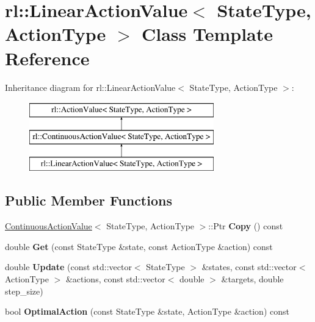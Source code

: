 \hypertarget{classrl_1_1_linear_action_value}{}\section{rl\+:\+:Linear\+Action\+Value$<$ State\+Type, Action\+Type $>$ Class Template Reference}
\label{classrl_1_1_linear_action_value}
Inheritance diagram for rl\+:\+:Linear\+Action\+Value$<$ State\+Type, Action\+Type $>$\+:\begin{figure}[H]
\begin{center}
\leavevmode
\includegraphics[height=3.000000cm]{classrl_1_1_linear_action_value}
\end{center}
\end{figure}
\subsection*{Public Member Functions}
\begin{DoxyCompactItemize}
\item 
\hypertarget{classrl_1_1_linear_action_value_a38781cd17ee3c35872554582d5b33cf1}{}\label{classrl_1_1_linear_action_value_a38781cd17ee3c35872554582d5b33cf1} 
\hyperlink{classrl_1_1_continuous_action_value}{Continuous\+Action\+Value}$<$ State\+Type, Action\+Type $>$\+::Ptr {\bfseries Copy} () const
\item 
\hypertarget{classrl_1_1_linear_action_value_a37f1230ba82a9f9b2581bfeeb1fde419}{}\label{classrl_1_1_linear_action_value_a37f1230ba82a9f9b2581bfeeb1fde419} 
double {\bfseries Get} (const State\+Type \&state, const Action\+Type \&action) const
\item 
\hypertarget{classrl_1_1_linear_action_value_acafc3b533933c6d69e0bf40f20f396a4}{}\label{classrl_1_1_linear_action_value_acafc3b533933c6d69e0bf40f20f396a4} 
double {\bfseries Update} (const std\+::vector$<$ State\+Type $>$ \&states, const std\+::vector$<$ Action\+Type $>$ \&actions, const std\+::vector$<$ double $>$ \&targets, double step\+\_\+size)
\item 
\hypertarget{classrl_1_1_linear_action_value_af77f4593812bca9a616bbb1a057c6215}{}\label{classrl_1_1_linear_action_value_af77f4593812bca9a616bbb1a057c6215} 
bool {\bfseries Optimal\+Action} (const State\+Type \&state, Action\+Type \&action) const
\end{DoxyCompactItemize}
